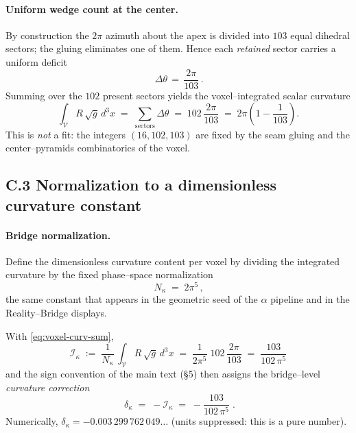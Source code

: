 \documentclass[11pt]{article}
\begin{document}
\begin{proposition}
\paragraph{Uniform wedge count at the center.}
By construction the $2\pi$ azimuth about the apex is divided into $103$ equal dihedral sectors; the gluing eliminates one of them. Hence each \emph{retained} sector carries a uniform deficit
\[
\boxed{\,\Delta\theta \,=\, \frac{2\pi}{103}\,}.
\]
Summing over the $102$ present sectors yields the voxel–integrated scalar curvature
\begin{equation}
\label{eq:voxel-curv-sum}
\int_{\mathscr V}\! R\,\sqrt{g}\,d^{3}x
\;=\;
\sum_{\text{sectors}} \Delta\theta
\;=\;
102\,\frac{2\pi}{103}
\;=\;
2\pi\!\left(1-\frac{1}{103}\right).
\end{equation}
This is \emph{not} a fit: the integers $(16,102,103)$ are fixed by the seam gluing and the center–pyramids combinatorics of the voxel.%

\subsection*{C.3  Normalization to a dimensionless curvature constant}

\paragraph{Bridge normalization.}
Define the dimensionless curvature content per voxel by dividing the integrated curvature by the fixed phase–space normalization
\[
\boxed{\,N_\kappa \;=\; 2\pi^{5}\,},
\]
the same constant that appears in the geometric seed of the $\alpha$ pipeline and in the Reality–Bridge displays.%

\noindent
With \eqref{eq:voxel-curv-sum},
\begin{equation}
\label{eq:I-kappa}
\boxed{\;
\mathcal I_{\kappa}
\;:=\;
\frac{1}{N_\kappa}\,
\int_{\mathscr V}\! R\,\sqrt{g}\,d^{3}x
\;=\;
\frac{1}{2\pi^{5}}\;
102\,\frac{2\pi}{103}
\;=\;
\frac{103}{102\,\pi^{5}}
\;}
\end{equation}
and the sign convention of the main text (\S5) then assigns the bridge–level \emph{curvature correction}
\begin{equation}
\label{eq:delta-kappa}
\boxed{\;
\delta_{\kappa}
\;=\;
-\mathcal I_{\kappa}
\;=\;
-\frac{103}{102\,\pi^{5}}
\;}.
\end{equation}
Numerically, $\delta_{\kappa}=-0.003\,299\,762\,049\ldots$ (units suppressed: this is a pure number).%


\end{proposition}
\end{document}
